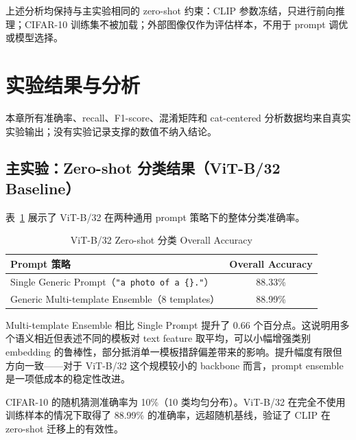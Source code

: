 \documentclass[12pt,a4paper]{ctexart}
\begin{document}
上述分析均保持与主实验相同的 zero-shot 约束：CLIP 参数冻结，只进行前向推理；CIFAR-10 训练集不被加载；外部图像仅作为评估样本，不用于 prompt 调优或模型选择。

\section{实验结果与分析}

本章所有准确率、recall、F1-score、混淆矩阵和 cat-centered 分析数据均来自真实实验输出；没有实验记录支撑的数值不纳入结论。

\subsection{主实验：Zero-shot 分类结果（ViT-B/32 Baseline）}

表~\ref{tab:vitb32-overall} 展示了 ViT-B/32 在两种通用 prompt 策略下的整体分类准确率。

\begin{table}[H]
\centering
\caption{ViT-B/32 Zero-shot 分类 Overall Accuracy}
\label{tab:vitb32-overall}
\begin{tabular}{lc}
\toprule
Prompt 策略 & Overall Accuracy \\
\midrule
Single Generic Prompt（\texttt{"a photo of a \{\}."}）& 88.33\% \\
Generic Multi-template Ensemble（8 templates）& 88.99\% \\
\bottomrule
\end{tabular}
\end{table}

Multi-template Ensemble 相比 Single Prompt 提升了 0.66 个百分点。这说明用多个语义相近但表述不同的模板对 text feature 取平均，可以小幅增强类别 embedding 的鲁棒性，部分抵消单一模板措辞偏差带来的影响。提升幅度有限但方向一致——对于 ViT-B/32 这个规模较小的 backbone 而言，prompt ensemble 是一项低成本的稳定性改进。

CIFAR-10 的随机猜测准确率为 10\%（10 类均匀分布）。ViT-B/32 在完全不使用训练样本的情况下取得了 88.99\% 的准确率，远超随机基线，验证了 CLIP 在 zero-shot 迁移上的有效性。
\end{document}
